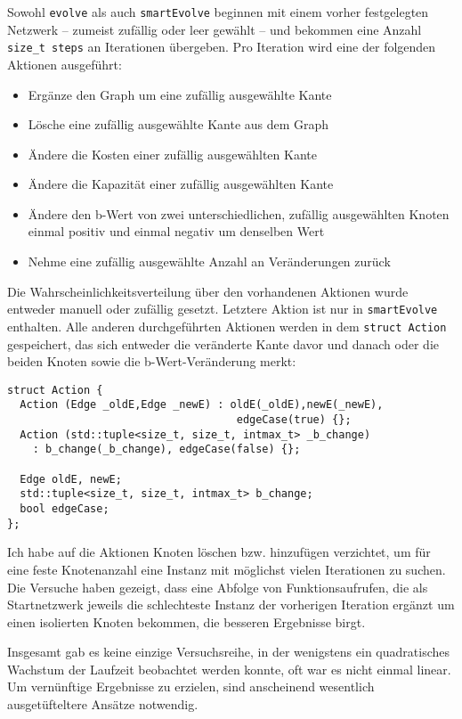 Sowohl \lstinline|evolve| als auch \lstinline|smartEvolve| beginnen mit einem vorher festgelegten Netzwerk -- zumeist zufällig oder leer gewählt -- und bekommen eine Anzahl \lstinline|size_t steps| an Iterationen übergeben. Pro Iteration wird eine der folgenden Aktionen ausgeführt:
\begin{itemize}\itemsep0em
    \item Ergänze den Graph um eine zufällig ausgewählte Kante
    \item Lösche eine zufällig ausgewählte Kante aus dem Graph
    \item Ändere die Kosten einer zufällig ausgewählten Kante
    \item Ändere die Kapazität einer zufällig ausgewählten Kante
    \item Ändere den b-Wert von zwei unterschiedlichen, zufällig ausgewählten Knoten einmal positiv und einmal negativ um denselben Wert
    \item Nehme eine zufällig ausgewählte Anzahl an Veränderungen zurück
\end{itemize}

Die Wahrscheinlichkeitsverteilung über den vorhandenen Aktionen wurde entweder manuell oder zufällig gesetzt. Letztere Aktion ist nur in \lstinline|smartEvolve| enthalten. Alle anderen durchgeführten Aktionen werden in dem \lstinline|struct Action| gespeichert, das sich entweder die veränderte Kante davor und danach oder die beiden Knoten sowie die b-Wert-Veränderung merkt:

\begin{lstlisting}
struct Action {
  Action (Edge _oldE,Edge _newE) : oldE(_oldE),newE(_newE),
                                    edgeCase(true) {};
  Action (std::tuple<size_t, size_t, intmax_t> _b_change)
    : b_change(_b_change), edgeCase(false) {};

  Edge oldE, newE;
  std::tuple<size_t, size_t, intmax_t> b_change;
  bool edgeCase;
};
\end{lstlisting}

Ich habe auf die Aktionen Knoten löschen bzw. hinzufügen verzichtet, um für eine feste Knotenanzahl eine Instanz mit möglichst vielen Iterationen zu suchen. Die Versuche haben gezeigt, dass eine Abfolge von Funktionsaufrufen, die als Startnetzwerk jeweils die schlechteste Instanz der vorherigen Iteration ergänzt um einen isolierten Knoten bekommen, die besseren Ergebnisse birgt.

Insgesamt gab es keine einzige Versuchsreihe, in der wenigstens ein quadratisches Wachstum der Laufzeit beobachtet werden konnte, oft war es nicht einmal linear. Um vernünftige Ergebnisse zu erzielen, sind anscheinend wesentlich ausgetüfteltere Ansätze notwendig.